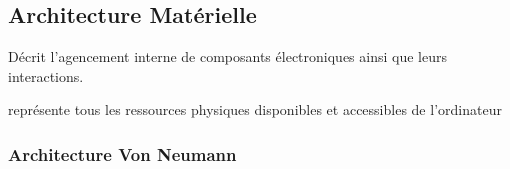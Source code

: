 \documentclass{article}
\begin{document}
\subsection{Architecture Matérielle}
\begin{definition}\label{def:architectureMaterielle}
    Décrit l'agencement interne de composants électroniques ainsi que leurs interactions.

    \begin{phrase}
        représente tous les ressources physiques disponibles et accessibles de l'ordinateur
    \end{phrase}
\end{definition}
\subsubsection{Architecture Von Neumann}
\end{document}
